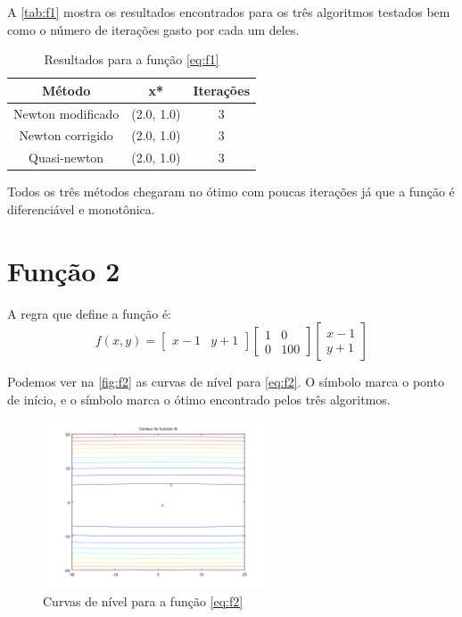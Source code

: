 \documentclass[12pt]{article}
\begin{document}
A \autoref{tab:f1} mostra os resultados encontrados para os três algoritmos testados bem como o número de iterações gasto por cada um deles.

\begin{table}[H]
\centering
\begin{tabular}{*3c}
\toprule
Método			&	x*		&	Iterações\\
\midrule
Newton modificado	&	(2.0, 1.0)	&	3\\
Newton corrigido	&	(2.0, 1.0)	&	3\\
Quasi-newton		&	(2.0, 1.0)	&	3\\
\bottomrule
\end{tabular}
\caption{\small{Resultados para a função \autoref{eq:f1} }}
\label{tab:f1}
\end{table}

Todos os três métodos chegaram no ótimo com poucas iterações já que a função é diferenciável e monotônica.


\section{Função 2}
A regra que define a função é:
\begin{equation}
\label{eq:f2}
f(x, y) = 
	   \begin{bmatrix}
            x - 1 & y + 1
           \end{bmatrix}            
           \begin{bmatrix}
	   1 	& 0 \\
	   0	& 100 
           \end{bmatrix} 
           \begin{bmatrix}
	   x - 1 \\
	   y + 1
           \end{bmatrix}
\end{equation}

Podemos ver na \autoref{fig:f2} as curvas de nível para \autoref{eq:f2}. O símbolo \textit{\textopenbullet} marca o ponto de início,
e o símbolo \textit{\texttimes} marca o ótimo encontrado pelos três algoritmos.

\begin{figure}[H]
  \centering
  \includegraphics[width=250px]{../matlab/images/f2_contour}
  \caption{Curvas de nível para a função \autoref{eq:f2}}
  \label{fig:f2}
\end{figure}
\end{document}
